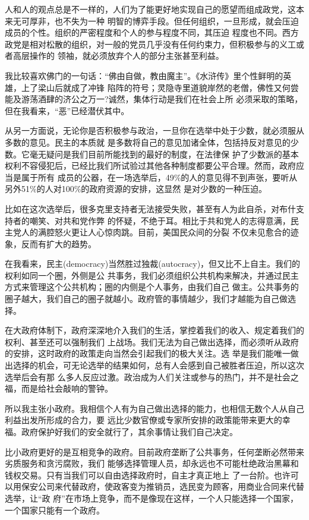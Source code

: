 ﻿\documentclass[11pt]{article}
\begin{document}
人和人的观点总是不一样的，人们为了能更好地实现自己的愿望而组成政党，这本来无可厚非，也不失为一种
明智的博弈手段。但任何组织，一旦形成，就会压迫成员的个性。组织的严密程度和个人的参与程度不同，其压迫
程度也不同。西方政党是相对松散的组织，对一般的党员几乎没有任何约束力，但积极参与的义工或者高层操作的
领袖，就必须放弃个人的部分主张甚至利益。

我比较喜欢佛门的一句话：``佛由自做，教由魔主''。《水浒传》里个性鲜明的英雄，上了梁山后就成了冲锋
陷阵的符号；灵隐寺里道貌岸然的老僧，佛性又何尝能及游荡酒肆的济公之万一?诚然，集体行动是我们在社会上所
必须采取的策略，但在我看来，``恶''已经潜伏其中。

从另一方面说，无论你是否积极参与政治，一旦你在选举中处于少数，就必须服从多数的意见。民主的本质就
是多数将自己的意见加诸全体，包括持反对意见的少数。它毫无疑问是我们目前所能找到的最好的制度，在法律保
护了少数派的基本权利不容侵犯后，已经比我们所试验过其他各种制度都要公平合理。然而，政府应当是属于所有
成员的公器，在一场选举后，49\%的人的意见得不到声张，要听从另外51\%的人对100\%的政府资源的安排，这显然
是对少数的一种压迫。

比如在这次选举后，很多克里支持者无法接受失败，甚至有人为此自杀，对布什支持者的嘲笑、对共和党作弊
的怀疑，不绝于耳。相比于共和党人的志得意满，民主党人的满腔怒火更让人心惊肉跳。目前，美国民众间的分裂
不仅未见愈合的迹象，反而有扩大的趋势。

在我看来，民主(democracy)当然胜过独裁(autocracy)，但又比不上自主。我们的权利如同一个圈，外侧是公
共事务，我们必须组织公共机构来解决，并通过民主方式来管理这个公共机构；圈的内侧是个人事务，由我们自己
做主。公共事务的圈子越大，我们自己的圈子就越小。政府管的事情越少，我们才越能为自己做选择。

在大政府体制下，政府深深地介入我们的生活，掌控着我们的收入、规定着我们的权利、甚至还可以强制我们
上战场。我们无法为自己做出选择，而必须听从政府的安排，这时政府的政策走向当然会引起我们的极大关注。选
举是我们能唯一做出选择的机会，可无论选举的结果如何，总有人会感到自己被胜者压迫，所以这次选举后会有那
么多人反应过激。政治成为人们关注或参与的热门，并不是社会之福，而是给社会敲响的警钟。

所以我主张小政府。我相信个人有为自己做出选择的能力，也相信无数个人从自己利益出发所形成的合力，要
远比少数官僚或专家所安排的政策能带来更大的幸福。政府保护好我们的安全就行了，其余事情让我们自己决定。

比小政府更好的是互相竞争的政府。目前政府垄断了公共事务，任何垄断必然带来劣质服务和贪污腐败，我们
能够选择管理人员，却永远也不可能杜绝政治黑幕和钱权交易。只有当我们可以自由选择政府时，自主才真正地上
了一台阶。也许可以用保安公司来代替政府，使政客变为推销员，选民变为顾客，用商业合同来代替选举，让``政
府''在市场上竞争，而不是像现在这样，一个人只能选择一个国家，一个国家只能有一个政府。
\end{document}
